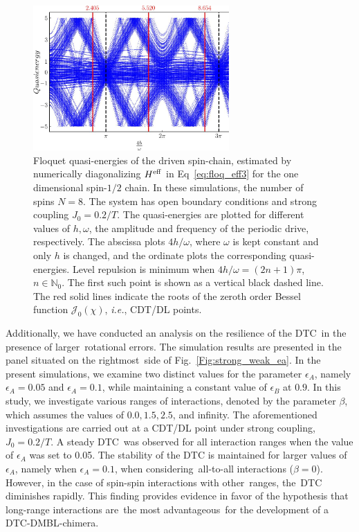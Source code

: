 \documentclass[%
nofootinbib,
reprint,
superscriptaddress,
amsmath,amssymb,showkeys,
aps,
prb,
]{revtex4-2}
\begin{document}
\begin{figure}[t]
	\centering
	\includegraphics[width=7.5cm]{quasienergy_8_lores.jpeg}
	\caption{Floquet quasi-energies of the driven spin-chain,  estimated by numerically diagonalizing $H^{\rm eff}$ in Eq~\ref{eq:floq_eff3} for the one dimensional spin-$1/2$ chain. In these simulations, the number of spins $N=8$. The system has open boundary conditions and strong coupling $J_0=0.2/T$. The quasi-energies are plotted for different values of $h,\omega$, the amplitude and frequency of the periodic drive, respectively.  The abscissa plots ${4h}/{\omega}$, where $\omega$ is kept constant and only $h$ is changed, and the ordinate plots the corresponding quasi-energies. Level repulsion is minimum when ${4h}/{\omega} = (2n+1)\pi$, $n\in \mathbb{N}_0$. The first such point is shown as a vertical black dashed line. The red solid lines indicate the roots of the zeroth order Bessel function $\mathcal{J}_0(\chi)$, \textit{i.e.}, CDT/DL points.}
	\label{Fig:quasienergy}
\end{figure}

Additionally, we have conducted an analysis on the resilience of the DTC in the presence of larger rotational errors. The simulation results are presented in the panel situated on the rightmost side of Fig.~\ref{Fig:strong_weak_ea}. In the present simulations, we examine two distinct values for the parameter $\epsilon_A$, namely $\epsilon_A = 0.05$ and $\epsilon_A = 0.1$, while maintaining a constant value of $\epsilon_B$ at $0.9$. In this study, we investigate various ranges of interactions, denoted by the parameter $\beta$, which assumes the values of $0.0, 1.5, 2.5$, and infinity. The aforementioned investigations are carried out at a CDT/DL point under strong coupling, $J_0 = 0.2/T$.  A steady DTC was observed for all interaction ranges when the value of $\epsilon_A$ was set to 0.05. The stability of the DTC is maintained for larger values of $\epsilon_A$, namely when $\epsilon_A = 0.1$, when considering all-to-all interactions ($\beta=0$). However, in the case of spin-spin interactions with other ranges, the DTC diminishes rapidly. This finding provides evidence in favor of the hypothesis that long-range interactions are the most advantageous for the development of a DTC-DMBL-chimera.
	
\end{document}
